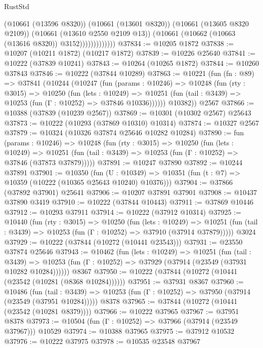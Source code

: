 \begin{lexlean}{RustStd}
\begin{coremodule}
                          (@10661 (@13596 @8320))
                          (@10661 (@13601 @8320))
                          (@10661 (@13605 @8320 @2109))
                          (@10661 (@13610 @2550 @2109 @13))
                          (@10661 (@10662 (@10663 (@13616 @8320)) @3152)))))))))))))
@37834 := @10205 @1872
@37838 := @10207 (@10211 @1872) (@10217 @1872)
@37839 := @10226 @25640
@37841 := @10222 (@37839 @10241)
@37843 := @10264 (@10265 @1872)
@37844 := @10260 @37843
@37846 := @10222 (@37844 @10289)
@37863 := @10221
    (fun (fn : @89) =>
    @37841
      (@10244
        (@10247
          (fun (params : @10246) =>
          @10248
            (fun (rty : @3015) =>
            @10250
              (fun (lets : @10249) =>
              @10251 (fun (tail : @3439) => @10253 (fun (Γ : @10252) => @37846 @10336))))))
        @10382))
    @2567
@37866 := @10388 (@37839 (@10239 @2567))
@37869 := @10301 (@10302 @2567) @25643
@37873 := @10222 (@10293 (@37869 @10310) @10314)
@37874 := @10327 @2567
@37879 := @10324 (@10326 @37874 @25646 @10282 @10284)
@37890 := fun (params : @10246) =>
  @10248
    (fun (rty : @3015) =>
    @10250
      (fun (lets : @10249) =>
      @10251 (fun (tail : @3439) => @10253 (fun (Γ : @10252) => @37846 (@37873 @37879)))))
@37891 := @10247 @37890
@37892 := @10244 @37891
@37901 := @10350
    (fun (U : @10349) => @10351 (fun (t : @7) => @10359 (@10222 (@10365 @25643 @10240) @10376)))
@37904 := @37866 (@37892 @37901) @25641
@37906 := @10207 @37891 @37901
@37908 := @10437 @37890 @3419
@37910 := @10222 (@37844 @10443)
@37911 := @37869 @10446
@37912 := @10293 @37911
@37914 := @10222 (@37912 @10314)
@37925 := @10440
    (fun (rty : @3015) =>
    @10250
      (fun (lets : @10249) =>
      @10251 (fun (tail : @3439) => @10253 (fun (Γ : @10252) => @37910 (@37914 @37879)))))
    @3024
@37929 := @10222 (@37844 (@10272 (@10441 @23543)))
@37931 := @23550 @37874 @25646
@37943 := @10462
    (fun (lets : @10249) =>
    @10251
      (fun (tail : @3439) =>
      @10253 (fun (Γ : @10252) => @37929 (@37914 (@23549 (@37931 @10282 @10284))))))
    @8367
@37950 := @10222 (@37844 (@10272 (@10441 (@23542 (@10281 (@8368 @10284))))))
@37951 := @37931 @8367
@37960 := @10486
    (fun (tail : @3439) => @10253 (fun (Γ : @10252) => @37950 (@37914 (@23549 (@37951 @10284)))))
    @8378
@37965 := @37844 (@10272 (@10441 (@23542 (@10281 @8379))))
@37966 := @10222 @37965
@37967 := @37951 @8378
@37973 := @10504 (fun (Γ : @10252) => @37966 (@37914 (@23549 @37967))) @10529
@37974 := @10388 @37965
@37975 := @37912 @10532
@37976 := @10222 @37975
@37978 := @10535 @23548 @37967

\end{coremodule}
\end{lexlean}
